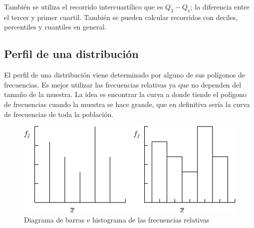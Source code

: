 \documentclass[12pt]{report}
\begin{document}
También se utiliza el recorrido intercuartílico que es $Q_3-Q_1$; la diferencia entre el
tercer y primer cuartil. También se pueden calcular recorridos con deciles, percentiles y
cuantiles en general.

\subsection{Perfil de una distribución}

El perfil de una distribución viene determinado por alguno de sus polígonos de
frecuencias. Es mejor utilizar las frecuencias relativas ya que no dependen del tama\~{n}o de
la muestra. La idea es encontrar la curva a donde tiende el polígono de frecuencias
cuando la muestra se hace grande, que en definitiva sería la curva de frecuencias de toda
la población.

\begin{figure}
\begin{center}
\includegraphics{diagrama.eps}
\end{center}
\caption{Diagrama de barras e  histograma de las frecuencias relativas }
\label{RELATIVES}
\end{figure}
\end{document}
